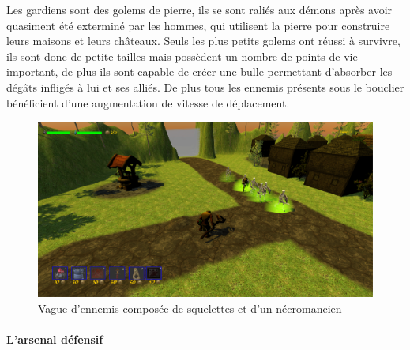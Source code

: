 \documentclass[a4paper, 12pt]{article}
\begin{document}
\par Les gardiens sont des golems de pierre, ils se sont raliés aux démons après avoir quasiment été exterminé par les hommes, qui utilisent la pierre pour construire leurs maisons et leurs châteaux. Seuls les plus petits golems ont réussi à survivre, ils sont donc de petite tailles mais possèdent un nombre de points de vie important, de plus ils sont capable de créer une bulle permettant d’absorber les dégâts infligés à lui et ses alliés. De plus tous les ennemis présents sous le bouclier bénéficient d’une augmentation de vitesse de déplacement.

\begin{figure}[!ht]
\centerline{\includegraphics[scale=0.3]{Enemis.png}}
\caption*{Vague d'ennemis compos\'ee de squelettes et d'un n\'ecromancien}
\end{figure}

			\paragraph{L'arsenal défensif}
			
\end{document}
